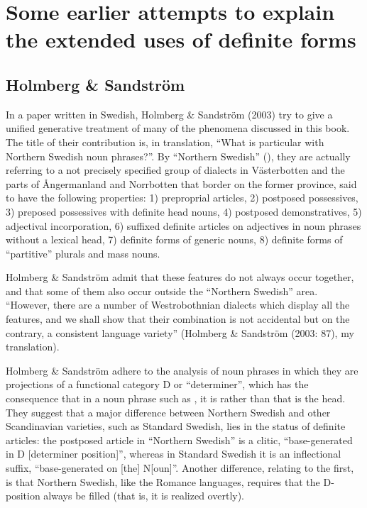 
\section{ Some earlier attempts to explain the extended uses of definite forms}
\subsection{ Holmberg \& Sandström}

In a paper written in Swedish, Holmberg \& Sandström (2003) try to give a unified generative treatment of many of the phenomena discussed in this book. The title of their contribution is, in translation, “What is particular with Northern Swedish noun phrases?”. By “Northern Swedish” (), they are actually referring to a not precisely specified group of dialects in Västerbotten and the parts of Ångermanland and Norrbotten that border on the former province, said to have the following properties: 1) preproprial articles, 2) postposed possessives, 3) preposed possessives with definite head nouns, 4) postposed demonstratives, 5) adjectival incorporation, 6) suffixed definite articles on adjectives in noun phrases without a lexical head, 7) definite forms of generic nouns, 8) definite forms of “partitive” plurals and mass nouns.


Holmberg \& Sandström admit that these features do not always occur together, and that some of them also occur outside the “Northern Swedish” area. “However, there are a number of Westrobothnian dialects which display all the features, and we shall show that their combination is not accidental but on the contrary, a consistent language variety” (Holmberg \& Sandström (2003: 87), my translation).


Holmberg \& Sandström adhere to the analysis of noun phrases in which they are projections of a functional category D or “determiner”, which has the consequence that in a noun phrase such as , it is  rather than  that is the head. They suggest that a major difference between Northern Swedish and other Scandinavian varieties, such as Standard Swedish, lies in the status of definite articles: the postposed article in “Northern Swedish” is a clitic, “base-generated in D [determiner position]”, whereas in Standard Swedish it is an inflectional suffix, “base-generated on [the] N[oun]”. Another difference, relating to the first, is that Northern Swedish, like the Romance languages, requires that the D-position always be filled (that is, it is realized overtly).

